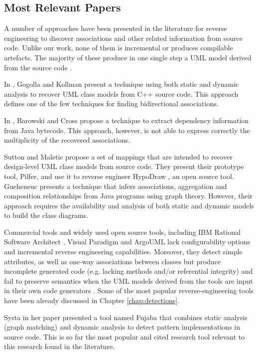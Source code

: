 \subsection{Most Relevant Papers}

A number of approaches have been presented in the literature for reverse engineering to discover associations and other related information from source code. Unlike our work, none of them is incremental or produces compilable artefacts. The majority of these produce in one single step a UML model derived from the source code \cite{Nelson1996}.

In \cite{Kollmann2001}, Gogolla and Kollman present a technique using both static and dynamic analysis to recover UML class models from C++ source code. This approach defines one of the few techniques for finding bidirectional associations.

In \cite{Barowski}, Barowski and Cross propose a technique to extract dependency information from Java bytecode. This approach, however, is not able to express correctly the multiplicity of the recovered associations.

Sutton and Maletic \cite{Sutton2007} propose a set of mappings that are intended to recover design-level UML class models from source code. They present their prototype tool, Pilfer, and use it to reverse engineer HypoDraw \cite{Hypodraw}, an open source tool.
Gueheneuc \cite{GueheneucSystematic} presents a technique that infers associations, aggregation and composition relationships from Java programs using graph theory. However, their approach requires the availability and analysis of both static and dynamic models to build the class diagrams.

Commercial tools and widely used open source tools, including IBM Rational Software Architect \cite{ROSE}, Visual Paradigm \cite{VisualParadigm} and ArgoUML \cite{ArgoUML} lack configurability options and incremental reverse engineering capabilities. Moreover, they detect simple attributes, as well as one-way associations between classes but produce incomplete generated code (e.g. lacking methods and/or referential integrity) and fail to preserve semantics when the UML models derived from the tools are input in their own code generators \cite{kollmanToolsCurrent}. Some of the most popular reverse-engineering tools have been already discussed in Chapter \ref{chap:detections}.

Systa in her paper \cite{Systa} presented a tool named Fujaba \cite{Systa} that combines static analysis (graph matching) and dynamic analysis to detect pattern implementations in source code. This is so far the most popular and cited research tool relevant to this research found in the literature.

